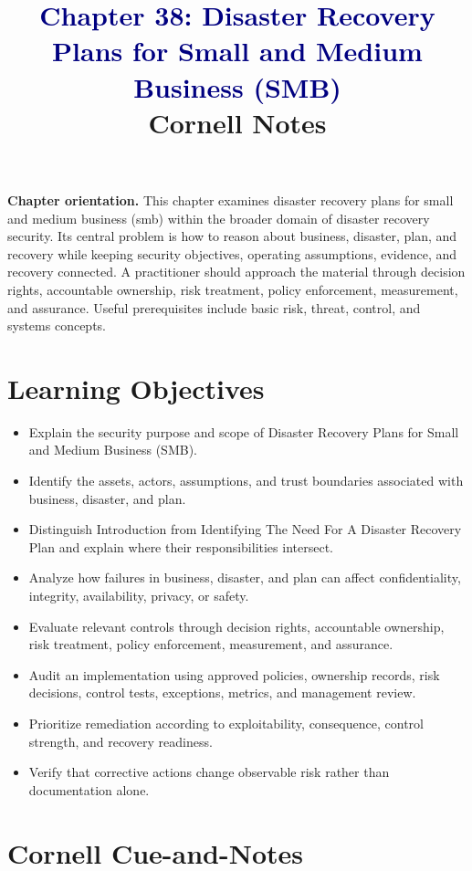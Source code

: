 \documentclass[11pt]{article}
\title{\textcolor{Navy}{Chapter 38: Disaster Recovery Plans for Small and Medium Business (SMB)}\\[2mm]\large Cornell Notes}
\author{}
\date{}
\begin{document}
\maketitle
\thispagestyle{fancy}
\vspace{-1.5em}
\begin{orientationbox}
\textbf{Chapter orientation.} This chapter examines disaster recovery plans for small and medium business (smb) within the broader domain of disaster recovery security. Its central problem is how to reason about business, disaster, plan, and recovery while keeping security objectives, operating assumptions, evidence, and recovery connected. A practitioner should approach the material through decision rights, accountable ownership, risk treatment, policy enforcement, measurement, and assurance. Useful prerequisites include basic risk, threat, control, and systems concepts.
\end{orientationbox}
\section*{Learning Objectives}
\begin{itemize}
\item Explain the security purpose and scope of Disaster Recovery Plans for Small and Medium Business (SMB).
\item Identify the assets, actors, assumptions, and trust boundaries associated with business, disaster, and plan.
\item Distinguish Introduction from Identifying The Need For A Disaster Recovery Plan and explain where their responsibilities intersect.
\item Analyze how failures in business, disaster, and plan can affect confidentiality, integrity, availability, privacy, or safety.
\item Evaluate relevant controls through decision rights, accountable ownership, risk treatment, policy enforcement, measurement, and assurance.
\item Audit an implementation using approved policies, ownership records, risk decisions, control tests, exceptions, metrics, and management review.
\item Prioritize remediation according to exploitability, consequence, control strength, and recovery readiness.
\item Verify that corrective actions change observable risk rather than documentation alone.
\end{itemize}
\section*{Cornell Cue-and-Notes}
\end{document}
